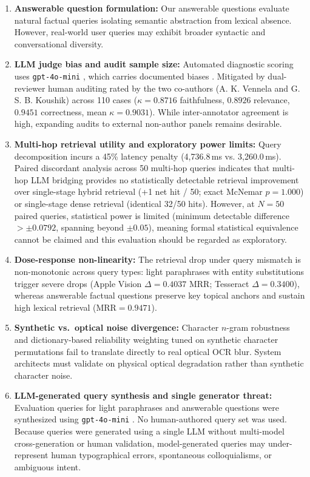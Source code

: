 \documentclass[conference]{IEEEtran}
\begin{document}
\begin{enumerate}
    \item \textbf{Answerable question formulation:} Our answerable questions evaluate natural factual queries isolating semantic abstraction from lexical absence. However, real-world user queries may exhibit broader syntactic and conversational diversity.
    \item \textbf{LLM judge bias and audit sample size:} Automated diagnostic scoring uses \texttt{gpt-4o-mini} \cite{openai2024gpt4o}, which carries documented biases \cite{zheng2023judging}. Mitigated by dual-reviewer human auditing rated by the two co-authors (A. K. Vennela and G. S. B. Koushik) across 110 cases ($\kappa = 0.8716$ faithfulness, $0.8926$ relevance, $0.9451$ correctness, mean $\kappa = 0.9031$). While inter-annotator agreement is high, expanding audits to external non-author panels remains desirable.
    \item \textbf{Multi-hop retrieval utility and exploratory power limits:} Query decomposition incurs a 45\% latency penalty (4,736.8\,ms vs. 3,260.0\,ms). Paired discordant analysis across 50 multi-hop queries indicates that multi-hop LLM bridging provides no statistically detectable retrieval improvement over single-stage hybrid retrieval (+1 net hit / 50; exact McNemar $p = 1.000$) or single-stage dense retrieval (identical 32/50 hits). However, at $N=50$ paired queries, statistical power is limited (minimum detectable difference $> \pm 0.0792$, spanning beyond $\pm 0.05$), meaning formal statistical equivalence cannot be claimed and this evaluation should be regarded as exploratory.
    \item \textbf{Dose-response non-linearity:} The retrieval drop under query mismatch is non-monotonic across query types: light paraphrases with entity substitutions trigger severe drops (Apple Vision $\Delta = 0.4037$ MRR; Tesseract $\Delta = 0.3400$), whereas answerable factual questions preserve key topical anchors and sustain high lexical retrieval ($\text{MRR} = 0.9471$).
    \item \textbf{Synthetic vs.\ optical noise divergence:} Character $n$-gram robustness and dictionary-based reliability weighting tuned on synthetic character permutations fail to translate directly to real optical OCR blur. System architects must validate on physical optical degradation rather than synthetic character noise.
    \item \textbf{LLM-generated query synthesis and single generator threat:} Evaluation queries for light paraphrases and answerable questions were synthesized using \texttt{gpt-4o-mini} \cite{openai2024gpt4o}. No human-authored query set was used. Because queries were generated using a single LLM without multi-model cross-generation or human validation, model-generated queries may under-represent human typographical errors, spontaneous colloquialisms, or ambiguous intent.

\end{enumerate}
\end{document}
